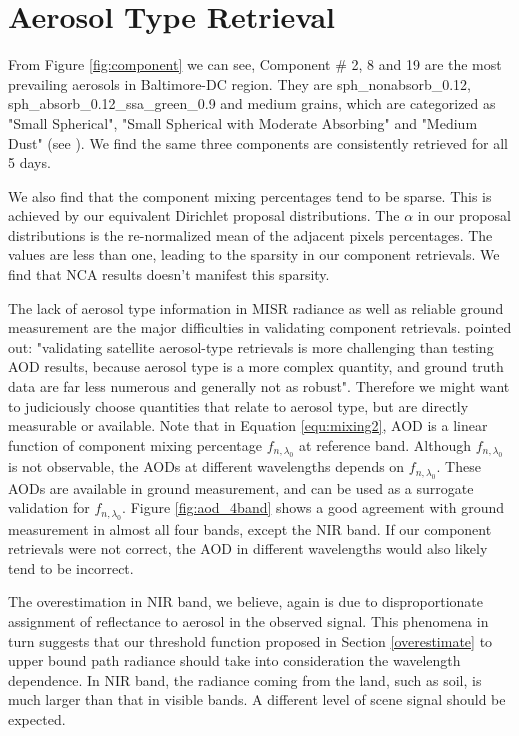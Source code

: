 \section{Aerosol Type Retrieval}
From Figure \ref{fig:component} we can see, Component \# 2, 8 and 19 are the most prevailing aerosols in Baltimore-DC region. They are sph\_nonabsorb\_0.12, sph\_absorb\_0.12\_ssa\_green\_0.9 and medium grains, which are categorized as "Small Spherical", "Small Spherical with Moderate Absorbing" and "Medium Dust" (see \cite{kahn2015}). We find the same three components are consistently retrieved for all 5 days.

We also find that the component mixing percentages tend to be sparse. This is achieved by our equivalent Dirichlet proposal distributions. The $\alpha$ in our proposal distributions is the re-normalized mean of the adjacent pixels percentages. The values are less than one, leading to the sparsity in our component retrievals. We find that NCA results doesn't manifest this sparsity.

The lack of aerosol type information in MISR radiance as well as reliable ground measurement are the major difficulties in validating component retrievals. \cite{kahn2015} pointed out: "validating satellite aerosol-type retrievals is more challenging than testing AOD results, because aerosol type is a more complex quantity, and ground truth data are far less numerous and generally not as robust". Therefore we might want to judiciously choose quantities that relate to aerosol type, but are directly measurable or available. Note that in Equation \eqref{equ:mixing2}, AOD is a linear function of component mixing percentage $f_{n,\lambda_0}$ at reference band. Although $f_{n,\lambda_0}$ is not observable, the AODs at different wavelengths depends on $f_{n,\lambda_0}$. These AODs are available in ground measurement, and can be used as a surrogate validation for $f_{n,\lambda_0}$. Figure \ref{fig:aod_4band} shows a good agreement with ground measurement in almost all four bands, except the NIR band. If our component retrievals were not correct, the AOD in different wavelengths would also likely tend to be incorrect.

The overestimation in NIR band, we believe, again is due to disproportionate assignment of reflectance to aerosol in the observed signal. This phenomena in turn suggests that our threshold function proposed in Section \ref{overestimate} to upper bound path radiance should take into consideration the wavelength dependence. In NIR band, the radiance coming from the land, such as soil, is much larger than that in visible bands. A different level of scene signal should be expected.

